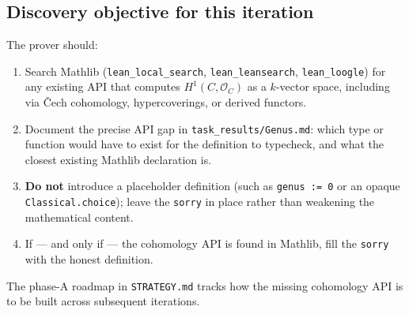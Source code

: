 \subsection{Discovery objective for this iteration}

The prover should:
\begin{enumerate}
  \item Search Mathlib (\texttt{lean\_local\_search}, \texttt{lean\_leansearch}, \texttt{lean\_loogle}) for any existing API that computes $H^1(C, \mathcal O_C)$ as a $k$-vector space, including via Čech cohomology, hypercoverings, or derived functors.
  \item Document the precise API gap in \lstinline{task_results/Genus.md}: which type or function would have to exist for the definition to typecheck, and what the closest existing Mathlib declaration is.
  \item \textbf{Do not} introduce a placeholder definition (such as \lstinline{genus := 0} or an opaque \lstinline{Classical.choice}); leave the \lstinline{sorry} in place rather than weakening the mathematical content.
  \item If — and only if — the cohomology API is found in Mathlib, fill the \lstinline{sorry} with the honest definition.
\end{enumerate}

The phase-A roadmap in \texttt{STRATEGY.md} tracks how the missing cohomology API is to be built across subsequent iterations.
